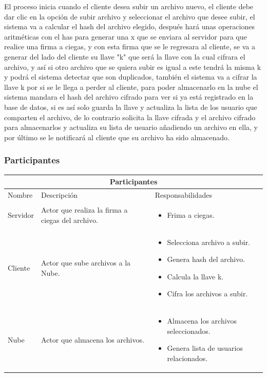 El proceso inicia cuando el cliente desea subir un archivo nuevo, el cliente debe dar clic en la opción de subir archivo y seleccionar el archivo que desee subir, el sistema va a calcular el hash del archivo elegido, después hará unas operaciones aritméticas con el has para generar una x que se enviara al servidor para que realice una firma a ciegas, y con esta firma que se le regresara al cliente, se va a generar del lado del cliente su llave "k" que será la llave con la cual cifrara el archivo, y así si otro archivo que se quiera subir es igual a este tendrá la misma k y podrá el sistema detectar que son duplicados, también el sistema va a cifrar la llave k por si se le llega a perder al cliente, para poder almacenarlo en la nube el sistema mandara el hash del archivo cifrado para ver si ya está registrado en la base de datos, si es así solo guarda la llave y actualiza la lista de los usuario que comparten el archivo, de lo contrario solicita la llave cifrada y el archivo cifrado para almacenarlos y actualiza su lista de usuario añadiendo un archivo en ella, y por último se le notificará al cliente que su archivo ha sido almacenado.



\subsubsection{Participantes}

\begin{tabular}{ |p{2cm}|p{6cm}|p{6cm}|  }
\hline
\multicolumn{3}{|c|}{  Participantes  } \\
\hline

{ Nombre }  & { Descripción } & { Responsabilidades} \\
\hline
{ Servidor } &  Actor que realiza la firma a ciegas del archivo.  &  
			\begin{itemize}	
				\item Frima a ciegas.

			\end{itemize}   \\ 
\hline
{ Cliente } &   Actor que sube archivos a la Nube.  &  
			\begin{itemize}	
				\item Selecciona archivo a subir.
				\item Genera hash del archivo. 
				\item Calcula la llave k.
				\item Cifra los archivos a subir.
			\end{itemize}   \\ 
\hline
{ Nube } &   Actor que almacena los archivos.  &  
			\begin{itemize}	
				\item Almacena los archivos seleccionados.
				\item Genera lista de usuarios relacionados.
			\end{itemize}   \\ 
\hline
\end{tabular}


